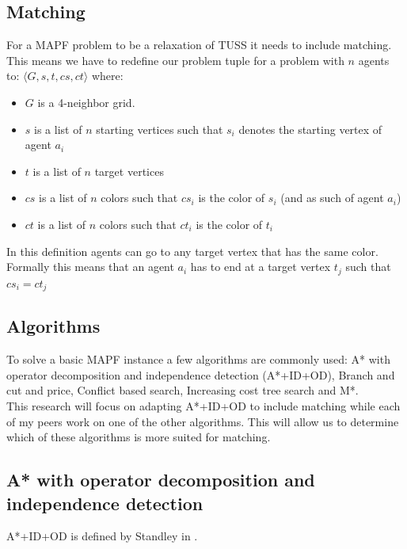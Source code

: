 \documentclass[english]{article}
\begin{document}
\subsection{Matching}
For a MAPF problem to be a relaxation of TUSS it needs to include matching.
This means we have to redefine our problem tuple for a problem with $n$ agents to: $\langle G, s,t, cs, ct\rangle$ where:
\begin{itemize}
	\item $G$ is a 4-neighbor grid.
	\item $s$ is a list of $n$ starting vertices such that $s_i$ denotes the starting vertex of agent $a_i$
	\item $t$ is a list of $n$ target vertices
	\item $cs$ is a list of $n$ colors such that $cs_i$ is the color of $s_i$ (and as such of agent $a_i$)
	\item $ct$ is a list of $n$ colors such that $ct_i$ is the color of $t_i$
\end{itemize}
In this definition agents can go to any target vertex that has the same color.
Formally this means that an agent $a_i$ has to end at a target vertex $t_j$ such that $cs_i=ct_j$

\subsection{Algorithms}
To solve a basic MAPF instance a few algorithms are commonly used: A* with operator decomposition and independence detection (A*+ID+OD)\cite{AStarIDOD_standley_2010}, Branch and cut and price\cite{bcp_lam_2019}, Conflict based search\cite{conflict_based_search_sharon_2015}, Increasing cost tree search\cite{icts_sharon_2013} and M*\cite{mstar_wagner_2011}.
\\
This research will focus on adapting A*+ID+OD to include matching while each of my peers work on one of the other algorithms.
This will allow us to determine which of these algorithms is more suited for matching.

\subsection{A* with operator decomposition and independence detection}
A*+ID+OD is defined by Standley in \cite{AStarIDOD_standley_2010}.
\end{document}
